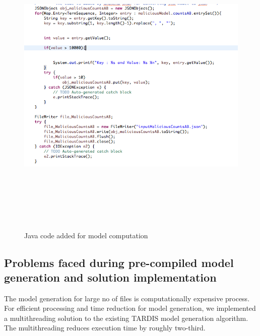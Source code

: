 \begin{figure}[htb]
\centering
\includegraphics[width=16cm,height=15cm,keepaspectratio]{image/model-computation.png}
\caption[Java code added for model computation ]{Java code added for model computation} 
\label{fig:model-computation}
\end{figure}

\subsection{Problems faced during pre-compiled model generation and solution implementation}

The model generation for large no of files is computationally expensive process.
For efficient processing and time reduction for model generation, we implemented a multithreading solution to the existing TARDIS model generation algorithm. The multithreading reduces execution time by roughly two-third. 

